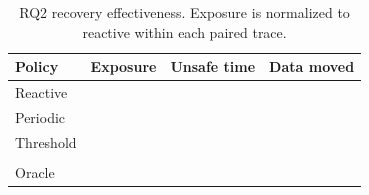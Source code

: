 \begin{table}[t]
  \centering
  \scriptsize
  \caption{RQ2 recovery effectiveness. Exposure is normalized to reactive within each paired trace.}
  \label{tab:rq2-results}
  \begin{tabular}{@{}lccc@{}}
    \toprule
    Policy & Exposure & Unsafe time & Data moved \\
    \midrule
    Reactive & \resultvalue{} & \resultvalue{} & \resultvalue{} \\
    Periodic & \resultvalue{} & \resultvalue{} & \resultvalue{} \\
    Threshold & \resultvalue{} & \resultvalue{} & \resultvalue{} \\
    \autopilot{} & \resultvalue{} & \resultvalue{} & \resultvalue{} \\
    Oracle & \resultvalue{} & \resultvalue{} & \resultvalue{} \\
    \bottomrule
  \end{tabular}
\end{table}
